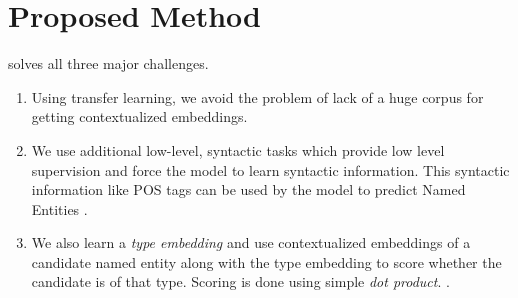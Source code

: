 \section{Proposed Method}
\label{sec:proposed_method}
\method{} solves all three major challenges.
\begin{enumerate}
	\item Using transfer learning, we avoid the problem of lack of a huge corpus for getting contextualized embeddings.
	\item We use additional low-level, syntactic tasks which provide low level supervision and force the model to learn syntactic information. This syntactic information like POS tags can be used by the model to predict Named Entities \cite{autoner} .
	\item We also learn a \textit{type embedding} and use contextualized embeddings of a candidate named entity along with the type embedding to score whether the candidate is of that type. Scoring is done using simple \textit{dot product}. .
\end{enumerate}